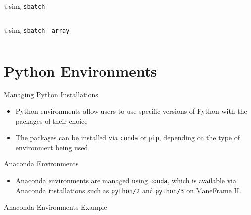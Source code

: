 \documentclass[aspectratio=169]{beamer}
\begin{document}
\begin{frame}{Using \texttt{sbatch}}
\begin{listing}[H]
\inputminted{sh}{examples/slurm_tutorial/05_sbatch_standard-mem-s.sbatch}
\caption{Using \texttt{sbatch} run parallel computations via an \texttt{sbatch} script.}
\end{listing}
\end{frame}

\begin{frame}{Using \texttt{sbatch --array}}
\begin{listing}[H]
\inputminted{sh}{examples/slurm_tutorial/06_sbatch_array.sbatch}
\caption{Using \texttt{sbatch --array} run parallel jobs via a single \texttt{sbatch} script.}
\end{listing}
\end{frame}

\section{Python Environments}

\begin{frame}{Managing Python Installations}
\begin{itemize}
\item Python environments allow users to use specific versions of Python with
the packages of their choice
\item The packages can be installed via \texttt{conda} or
\texttt{pip}, depending on the type of environment being used
\end{itemize}
\end{frame}

\begin{frame}{Anaconda Environments}
\begin{itemize}
\item Anaconda environments are managed using \texttt{conda}, which is
available via Anaconda installations such as \texttt{python/2} and
\texttt{python/3} on ManeFrame II.
\end{itemize}
\end{frame}

\begin{frame}{Anaconda Environments Example}
\begin{listing}[H]
\inputminted[firstline=3,firstnumber=1]{sh}{examples/conda_environments.sh}
\caption{A specific version of Python is installed along with the JupyterLab
package and its dependencies. The new environment is then loaded and then
unloaded.}
\end{listing}
\end{frame}
\end{document}
